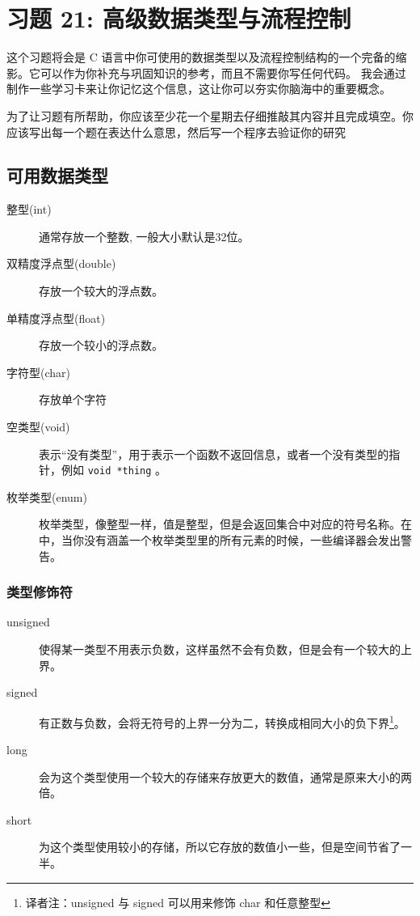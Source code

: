 \chapter{习题 21: 高级数据类型与流程控制}

这个习题将会是 C 语言中你可使用的数据类型以及流程控制结构的一个完备的缩影。它可以作为你补充与巩固知识的参考，而且不需要你写任何代码。
我会通过制作一些学习卡来让你记忆这个信息，这让你可以夯实你脑海中的重要概念。

为了让习题有所帮助，你应该至少花一个星期去仔细推敲其内容并且完成填空。你应该写出每一个题在表达什么意思，然后写一个程序去验证你的研究

\section{可用数据类型}

\begin{description}
\item[整型(int)] 通常存放一个整数, 一般大小默认是32位。
\item[双精度浮点型(double)] 存放一个较大的浮点数。
\item[单精度浮点型(float)] 存放一个较小的浮点数。
\item[字符型(char)] 存放单个字符
\item[空类型(void)] 表示“没有类型”，用于表示一个函数不返回信息，或者一个没有类型的指针，例如 \verb|void *thing| 。
\item[枚举类型(enum)] 枚举类型，像整型一样，值是整型，但是会返回集合中对应的符号名称。在  中，当你没有涵盖一个枚举类型里的所有元素的时候，一些编译器会发出警告。
\end{description}

\subsection{类型修饰符}

\begin{description}
\item[unsigned] 使得某一类型不用表示负数，这样虽然不会有负数，但是会有一个较大的上界。
\item[signed] 有正数与负数，会将无符号的上界一分为二，转换成相同大小的负下界\footnote{译者注：unsigned 与 signed 可以用来修饰 char 和任意整型 }。
\item[long] 会为这个类型使用一个较大的存储来存放更大的数值，通常是原来大小的两倍。
\item[short] 为这个类型使用较小的存储，所以它存放的数值小一些，但是空间节省了一半。
\end{description}


